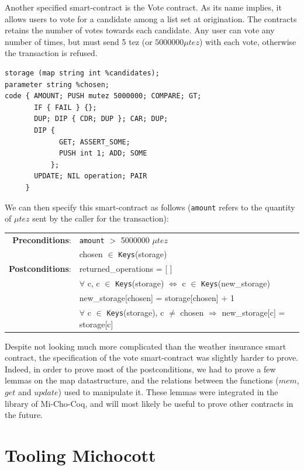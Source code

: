\documentclass{report}
\begin{document}
Another specified smart-contract is the Vote contract. As its name implies, it allows users to vote for a candidate among a list set at origination. The contracts retains the number of votes towards each candidate. Any user can vote any number of times, but must send 5 tez (or $5000000\mu tez$) with each vote, otherwise the transaction is refused.

\begin{lstlisting}[language=michelson]
storage (map string int %candidates);
parameter string %chosen;
code { AMOUNT; PUSH mutez 5000000; COMPARE; GT;
       IF { FAIL } {};
       DUP; DIP { CDR; DUP }; CAR; DUP;
       DIP {
             GET; ASSERT_SOME;
             PUSH int 1; ADD; SOME
           };
       UPDATE; NIL operation; PAIR
     }
\end{lstlisting}

We can then specify this smart-contract as follows (\texttt{amount} refers to the quantity of $\mu tez$ sent by the caller for the transaction):
{\small
\begin{longtable}{rl}
  \textbf{Preconditions}: & \texttt{amount} $>$ 5000000 $\mu tez$\\
  & chosen $\in$ \texttt{Keys}(storage)\\
  \textbf{Postconditions}: & returned\_operations = [ ]\\
  & $\forall$ c, c $\in$ \texttt{Keys}(storage) $\iff$ c $\in$ \texttt{Keys}(new\_storage)\\
  & new\_storage[chosen] = storage[chosen] + 1\\
  & $\forall$ c $\in$ \texttt{Keys}(storage), c $\neq$ chosen $\Rightarrow$ new\_storage[c] = storage[c]
\end{longtable}}

Despite not looking much more complicated than the weather insurance smart contract, the specification of the vote smart-contract was slightly harder to prove. Indeed, in order to prove most of the postconditions, we had to prove a few lemmas on the map datastructure, and the relations between the functions ($mem$, $get$ and $update$) used to manipulate it. These lemmas were integrated in the library of Mi-Cho-Coq, and will most likely be useful to prove other contracts in the future.


\section{Tooling Michocott}
\end{document}
